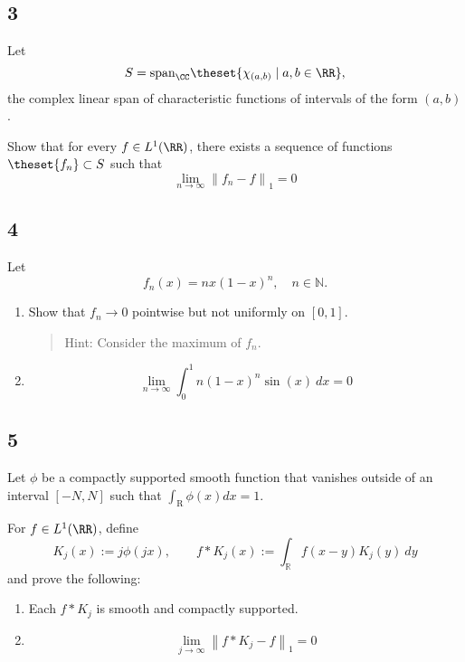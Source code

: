 \hypertarget{section-2}{%
\subsection{3}\label{section-2}}

Let \[
S = \mathrm{span}_\CC\theset{\chi_{(a, b)} \mid a, b \in \RR},
\] the complex linear span of characteristic functions of intervals of
the form \((a, b)\).

Show that for every \(f\in L^1(\RR)\), there exists a sequence of
functions \(\theset{f_n} \subset S\) such that \[
\lim _{n \rightarrow \infty}\left\|f_{n}-f\right\|_{1}=0
\]

\hypertarget{section-3}{%
\subsection{4}\label{section-3}}

Let \[
f_{n}(x)=n x(1-x)^{n}, \quad n \in \mathbb{N}.
\]

\begin{enumerate}
\def\labelenumi{\arabic{enumi}.}
\item
  Show that \(f_n \to 0\) pointwise but not uniformly on \([0, 1]\).

  \begin{quote}
  Hint: Consider the maximum of \(f_n\).
  \end{quote}
\item
  \[
    \lim _{n \rightarrow \infty} \int_{0}^{1} n(1-x)^{n} \sin(x)~dx=0
  \]
\end{enumerate}

\hypertarget{section-4}{%
\subsection{5}\label{section-4}}

Let \(\phi\) be a compactly supported smooth function that vanishes
outside of an interval \([-N, N]\) such that
\(\int_{\mathrm{R}} \phi(x) d x=1\).

For \(f\in L^1(\RR)\), define \[
K_{j}(x):=j \phi(j x), \quad \quad f \ast K_{j}(x):=\int_{\mathbb{R}} f(x-y) K_{j}(y)~dy
\] and prove the following:

\begin{enumerate}
\def\labelenumi{\arabic{enumi}.}
\item
  Each \(f\ast K_j\) is smooth and compactly supported.
\item
  \[
  \lim _{j \rightarrow \infty}\left\|f * K_{j}-f\right\|_{1}=0
  \]
\end{enumerate}

